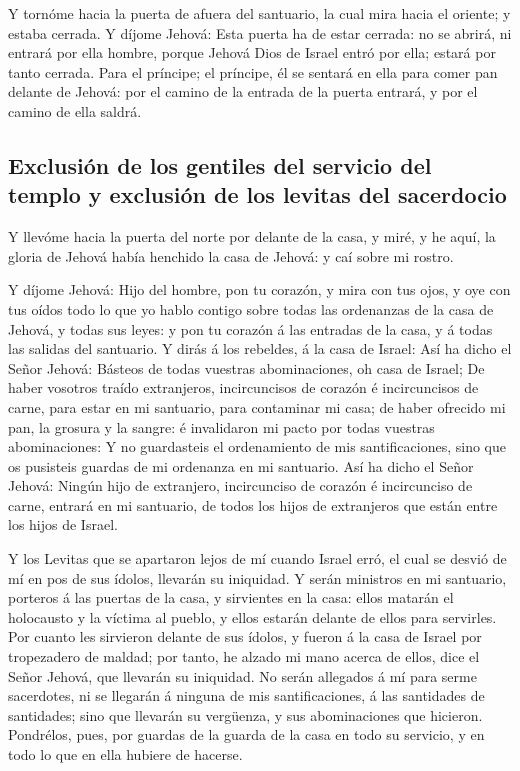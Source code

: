  Y tornóme hacia la puerta de afuera del santuario, la cual
mira hacia el oriente; y estaba cerrada.  Y díjome Jehová:
Esta puerta ha de estar cerrada: no se abrirá, ni entrará por ella
hombre, porque Jehová Dios de Israel entró por ella; estará por tanto
cerrada.  Para el príncipe; el príncipe, él se sentará en
ella para comer pan delante de Jehová: por el camino de la entrada de la
puerta entrará, y por el camino de ella saldrá.

\hypertarget{exclusiuxf3n-de-los-gentiles-del-servicio-del-templo-y-exclusiuxf3n-de-los-levitas-del-sacerdocio}{%
\subsection{Exclusión de los gentiles del servicio del templo y
exclusión de los levitas del
sacerdocio}\label{exclusiuxf3n-de-los-gentiles-del-servicio-del-templo-y-exclusiuxf3n-de-los-levitas-del-sacerdocio}}

 Y llevóme hacia la puerta del norte por delante de la casa,
y miré, y he aquí, la gloria de Jehová había henchido la casa de Jehová:
y caí sobre mi rostro.

 Y díjome Jehová: Hijo del hombre, pon tu corazón, y mira
con tus ojos, y oye con tus oídos todo lo que yo hablo contigo sobre
todas las ordenanzas de la casa de Jehová, y todas sus leyes: y pon tu
corazón á las entradas de la casa, y á todas las salidas del santuario.
 Y dirás á los rebeldes, á la casa de Israel: Así ha dicho
el Señor Jehová: Básteos de todas vuestras abominaciones, oh casa de
Israel;  De haber vosotros traído extranjeros, incircuncisos
de corazón é incircuncisos de carne, para estar en mi santuario, para
contaminar mi casa; de haber ofrecido mi pan, la grosura y la sangre: é
invalidaron mi pacto por todas vuestras abominaciones:  Y no
guardasteis el ordenamiento de mis santificaciones, sino que os
pusisteis guardas de mi ordenanza en mi santuario.  Así ha
dicho el Señor Jehová: Ningún hijo de extranjero, incircunciso de
corazón é incircunciso de carne, entrará en mi santuario, de todos los
hijos de extranjeros que están entre los hijos de Israel.

 Y los Levitas que se apartaron lejos de mí cuando Israel
erró, el cual se desvió de mí en pos de sus ídolos, llevarán su
iniquidad.  Y serán ministros en mi santuario, porteros á
las puertas de la casa, y sirvientes en la casa: ellos matarán el
holocausto y la víctima al pueblo, y ellos estarán delante de ellos para
servirles.  Por cuanto les sirvieron delante de sus ídolos,
y fueron á la casa de Israel por tropezadero de maldad; por tanto, he
alzado mi mano acerca de ellos, dice el Señor Jehová, que llevarán su
iniquidad.  No serán allegados á mí para serme sacerdotes,
ni se llegarán á ninguna de mis santificaciones, á las santidades de
santidades; sino que llevarán su vergüenza, y sus abominaciones que
hicieron.  Pondrélos, pues, por guardas de la guarda de la
casa en todo su servicio, y en todo lo que en ella hubiere de hacerse.

